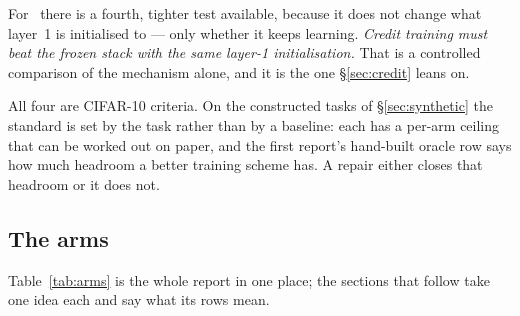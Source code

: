 For \ideaC\ there is a fourth, tighter test available, because it does not change what layer~1
is initialised to --- only whether it keeps learning. \emph{Credit training must beat the
frozen stack with the same layer-1 initialisation.} That is a controlled comparison of the
mechanism alone, and it is the one \S\ref{sec:credit} leans on.

All four are CIFAR-10 criteria. On the constructed tasks of \S\ref{sec:synthetic} the standard
is set by the task rather than by a baseline: each has a per-arm ceiling that can be worked
out on paper, and the first report's hand-built oracle row says how much headroom a better
training scheme has. A repair either closes that headroom or it does not.

\subsection{The arms}

\begin{table}[h]
\centering\small
\caption{CIFAR-10 test accuracy by arm, mean $\pm$ standard deviation of the best test accuracy
over seeds.  is the total clause budget (both layers where there are two),
 the automaton count in millions,  how many seeds the row averages, and  the summed
per-epoch training time across all trainable stages. The first six rows are the E1 baselines of the first report; the
 rows name the layer-1 firing-rate target in percent (\S\ref{sec:density}).}
\label{tab:arms}
\end{table}

Table~\ref{tab:arms} is the whole report in one place; the sections that follow take one idea
each and say what its rows mean.
